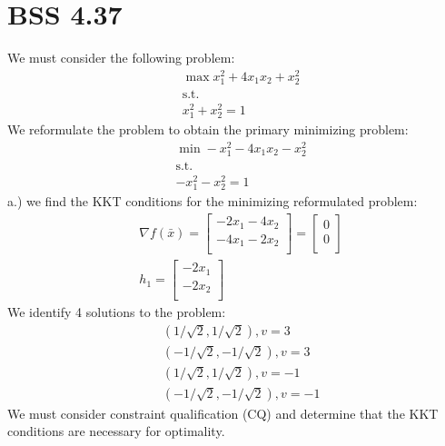 \documentclass[12pt]{article}
\begin{document}
\section{BSS 4.37}
We must consider the following problem: 
    \begin{align*}
        &\max x_1^2 + 4x_1x_2 + x_2^2\\
        &\text{s.t.}\\
        &x_1^2 + x_2^2 = 1
    \end{align*}
We reformulate the problem to obtain the primary minimizing problem:\\
    \begin{align*}
        &\min -x_1^2 - 4x_1x_2 - x_2^2\\
        &\text{s.t.}\\
        &-x_1^2 - x_2^2 = 1
    \end{align*}
a.) we find the KKT conditions for the minimizing reformulated problem:\\ 
    \begin{align*}
        &\nabla f(\bar x) = 
        \begin{bmatrix}
            -2x_1 - 4x_2 \\
            -4x_1 - 2x_2 \\
        \end{bmatrix} = 
        \begin{bmatrix}
            0 \\
            0 \\
        \end{bmatrix}\\
        &h_1 = 
        \begin{bmatrix}
            -2x_1 \\
            -2x_2 \\
        \end{bmatrix}
    \end{align*}
We identify 4 solutions to the problem:\\
    \begin{align*}
        &(1/\sqrt{2}, 1/\sqrt{2}), v = 3 \\ 
        &(-1/\sqrt{2}, -1/\sqrt{2}), v = 3 \\
        &(1/\sqrt{2}, 1/\sqrt{2}), v = -1 \\
        &(-1/\sqrt{2}, -1/\sqrt{2}), v = -1
    \end{align*}
We must consider constraint qualification (CQ) and determine that the KKT conditions are necessary for optimality.\\ 
\end{document}
